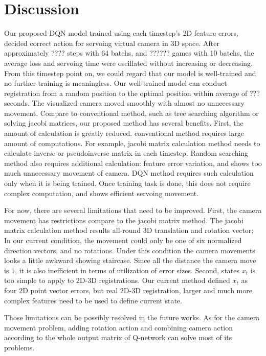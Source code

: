 \documentclass[10pt]{article}
\begin{document}
\section{Discussion}
 Our proposed DQN model trained using each timestep's 2D feature errors, decided correct action for servoing virtual camera in 3D space. After approximately ???? steps with 64 batchs, and ?????? games with 10 batchs, the average loss and servoing time were oscillated without increasing or decreasing. From this timestep point on, we could regard that our model is well-trained and no further training is meaningless. Our well-trained model can conduct registration from a random position to the optimal position within average of ??? seconds. The visualized camera moved smoothly with almost no unnecessary movement. Compare to conventional method, such as tree searching algorithm or solving jacobi matrices, our proposed method has several benefits. First, the amount of calculation is greatly reduced. conventional method requires large amount of computations. For example, jacobi matrix calculation method needs to calculate inverse or pseudoinverse matrix in each timestep. Random searching method also requires additional calculation: feature error variation, and shows too much unnecessary movement of camera. DQN method requires such calculation only when it is being trained. Once training task is done, this does not require complex computation, and shows efficient servoing movement.

 For now, there are several limitations that need to be improved. First, the camera movement has restrictions compare to the jacobi matrix method. The jacobi matrix calculation method results all-round 3D translation and rotation vector; In our current condition, the movement could only be one of six normalized direction vectors, and no rotations. Under this condition the camera movements looks a little awkward showing staircase. Since all the distance the camera move is $1$, it is also inefficient in terms of utilization of error sizes. Second, states $x_t$ is too simple to apply to 2D-3D registrations. Our current method defined $x_t$ as four 2D point vector errors, but real 2D-3D registration, larger and much more complex features need to be used to define current state.

 Those limitations can be possibly resolved in the future works. As for the camera movement problem, adding rotation action and combining camera action according to the whole output matrix of Q-network can solve most of its problems.
\end{document}
